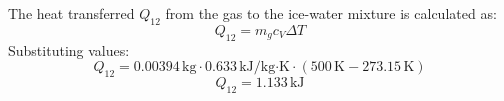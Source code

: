 The heat transferred \( Q_{12} \) from the gas to the ice-water mixture is calculated as:  
\[
Q_{12} = m_g c_V \Delta T
\]  
Substituting values:  
\[
Q_{12} = 0.00394 \, \text{kg} \cdot 0.633 \, \text{kJ/kg·K} \cdot (500 \, \text{K} - 273.15 \, \text{K})
\]  
\[
Q_{12} = 1.133 \, \text{kJ}
\]